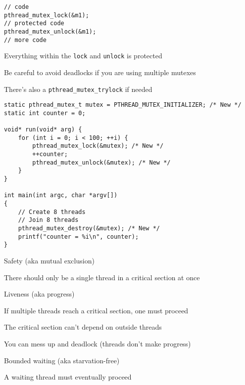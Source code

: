   \begin{slide}


    \begin{verbatim}
// code
pthread_mutex_lock(&m1);
// protected code
pthread_mutex_unlock(&m1);
// more code
    \end{verbatim}
    \medskip

    Everything within the {\tt lock} and {\tt unlock} is protected
    \medskip

    Be careful to avoid deadlocks if you are using multiple mutexes
    \medskip

    There's also a {\tt pthread\_mutex\_trylock} if needed

  \end{slide}

  \begin{slide}


    \begin{verbatim}
static pthread_mutex_t mutex = PTHREAD_MUTEX_INITIALIZER; /* New */
static int counter = 0;

void* run(void* arg) {
    for (int i = 0; i < 100; ++i) {
        pthread_mutex_lock(&mutex); /* New */
        ++counter;
        pthread_mutex_unlock(&mutex); /* New */
    }
}

int main(int argc, char *argv[])
{
    // Create 8 threads
    // Join 8 threads
    pthread_mutex_destroy(&mutex); /* New */
    printf("counter = %i\n", counter);
}
    \end{verbatim}

  \end{slide}

  \begin{slide}


    Safety (aka mutual exclusion)

    \leftspace{}There should only be a single thread in a critical section at
    once
    \medskip

    Liveness (aka progress)

    \leftspace{}If multiple threads reach a critical section, one must proceed

    \leftspace{}The critical section can't depend on outside threads

    \leftspace{}\leftspace{}You can mess up and deadlock (threads don't make progress)
    \medskip

    Bounded waiting (aka starvation-free)

    \leftspace{}A waiting thread must eventually proceed

  \end{slide}

